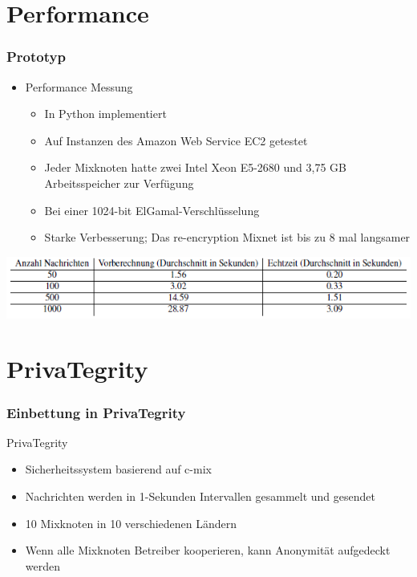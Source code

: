 \documentclass[t, xcolor=dvipsnames]{beamer}
\begin{document}
\section{Performance}
\begin{frame}
	\frametitle{Prototyp}
	\begin{itemize}
		\item Performance Messung
			\begin{itemize}
				\item In Python implementiert
				\item Auf Instanzen des Amazon Web Service EC2 getestet
				\item Jeder Mixknoten hatte zwei Intel Xeon E5-2680 und 3,75 GB Arbeitsspeicher zur Verfügung
				\item Bei einer 1024-bit ElGamal-Verschlüsselung
				\item Starke Verbesserung; Das re-encryption Mixnet ist bis zu 8 mal langsamer
			\end{itemize}
			
	\end{itemize}
	\begin{center}
				\includegraphics [width=1\textwidth]{pic/PrototypMessung.png}
			\end{center}
	\vspace{\fill}
\end{frame}

\section{PrivaTegrity}

\begin{frame}
	\frametitle{Einbettung in PrivaTegrity}
 PrivaTegrity
			\begin{itemize}
				\item Sicherheitssystem basierend auf c-mix
				\item Nachrichten werden in 1-Sekunden Intervallen gesammelt und gesendet
				\item 10 Mixknoten in 10 verschiedenen Ländern
				\item Wenn alle Mixknoten Betreiber kooperieren, kann Anonymität aufgedeckt werden
			\end{itemize}

	\vspace{\fill}
\end{frame}
\end{document}
